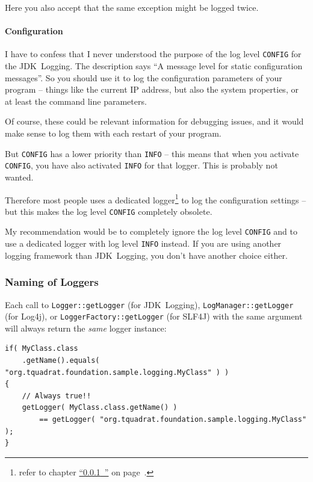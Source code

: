 \documentclass[11pt,a4paper, titlepage, parskip=half, headsepline, footsepline, cleardoublepage=current, headheight=1cm]{scrbook}
\newcommand*{\tqfullvref}[1]{\hyperref[{#1}]{“\ref*{#1}~\nameref*{#1}”} on page~\pageref{#1}}
\begin{document}
Here you also accept that the same exception might be logged twice.

\paragraph{Configuration} I have to confess that I never understood the purpose of the log level \verb#CONFIG# for the JDK~Logging. The description says “A message level for static configuration messages”. So you should use it to log the configuration parameters of your program – things like the current IP address, but also the system properties, or at least the command line parameters.

Of course, these could be relevant information for debugging issues, and it would make sense to log them with each restart of your program.

But \verb#CONFIG# has a lower priority than \verb#INFO# – this means that when you activate \verb#CONFIG#, you have also activated \verb#INFO# for that logger. This is probably not wanted.

Therefore most people uses a dedicated logger\footnote{refer to chapter \tqfullvref{sec:NamingOfLoggers}.} to log the configuration settings – but this makes the log level \verb#CONFIG# completely obsolete.

My recommendation would be to completely ignore the log level \verb#CONFIG# and to use a dedicated logger with log level \verb#INFO# instead. If you are using another logging framework than JDK~Logging, you don't have another choice either.


\subsubsection{Naming of Loggers}\label{sec:NamingOfLoggers}
Each call to \lstinline|Logger::getLogger| (for JDK~Logging), \lstinline|LogManager::getLogger| (for Log4j), or \lstinline|LoggerFactory::getLogger| (for SLF4J) with the same argument will always return the \textit{same} logger instance:
\begin{lstlisting}
if( MyClass.class
    .getName().equals( "org.tquadrat.foundation.sample.logging.MyClass" ) )
{
    // Always true!!
    getLogger( MyClass.class.getName() )
        == getLogger( "org.tquadrat.foundation.sample.logging.MyClass" );
}
\end{lstlisting}
\end{document}

